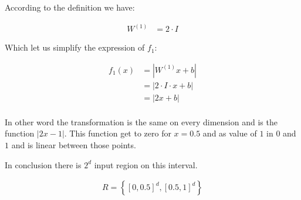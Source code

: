
According to the definition we have:

\begin{align*}
    W^{(1)} &= 2 \cdot I
\end{align*}

Which let us simplify the expression of $f_1$:

\begin{align*}
    f_1(x) &= | W^{(1)} x + b | \\
    &= | 2 \cdot I \cdot x + b | \\
    &= | 2 x + b | \\
\end{align*}

In other word the transformation is the same on every dimension and is the function $| 2 x - 1 |$.
This function get to zero for $x=0.5$ and as value of $1$ in $0$ and $1$ and is linear between those points.

In conclusion there is $2^d$ input region on this interval.

\begin{align*}
    R = \left\{ \left[ 0, 0.5 \right]^d , \left[ 0.5, 1 \right]^d \right\}
\end{align*}


